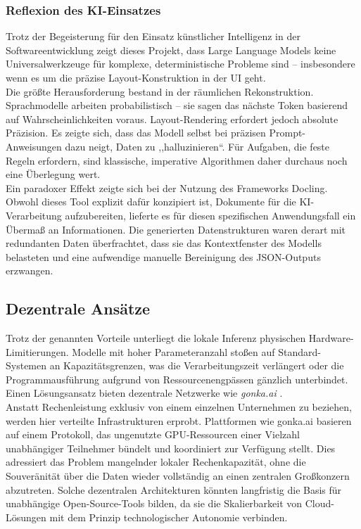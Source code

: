 \documentclass[a4paper]{article}
\begin{document}
\subsubsection{Reflexion des KI-Einsatzes}
Trotz der Begeisterung für den Einsatz künstlicher Intelligenz in der Softwareentwicklung zeigt dieses Projekt, dass Large Language Models keine Universalwerkzeuge für komplexe, deterministische Probleme sind – insbesondere wenn es um die präzise Layout-Konstruktion in der UI geht.\\


Die größte Herausforderung bestand in der räumlichen Rekonstruktion. Sprachmodelle arbeiten probabilistisch – sie sagen das nächste Token basierend auf Wahrscheinlichkeiten voraus. Layout-Rendering erfordert jedoch absolute Präzision.
Es zeigte sich, dass das Modell selbst bei präzisen Prompt-Anweisungen dazu neigt, Daten zu ,,halluzinieren``. Für Aufgaben, die feste Regeln erfordern, sind klassische, imperative Algorithmen daher durchaus noch eine Überlegung wert.\\


Ein paradoxer Effekt zeigte sich bei der Nutzung des Frameworks {Docling}. Obwohl dieses Tool explizit dafür konzipiert ist, Dokumente für die KI-Verarbeitung aufzubereiten, lieferte es für diesen spezifischen Anwendungsfall ein Übermaß an Informationen. Die generierten Datenstrukturen waren derart mit redundanten Daten überfrachtet, dass sie das Kontextfenster des Modells belasteten und eine aufwendige manuelle Bereinigung des JSON-Outputs erzwangen.


\subsection{Dezentrale Ansätze}

Trotz der genannten Vorteile unterliegt die lokale Inferenz physischen Hardware-Limitierungen. Modelle mit hoher Parameteranzahl stoßen auf Standard-Systemen an Kapazitätsgrenzen, was die Verarbeitungszeit verlängert oder die Programmausführung aufgrund von Ressourcenengpässen gänzlich unterbindet. Einen Lösungsansatz bieten dezentrale Netzwerke wie \textit{gonka.ai} \citep{GonkaAI}.\\

Anstatt Rechenleistung exklusiv von einem einzelnen Unternehmen zu beziehen, werden hier verteilte Infrastrukturen erprobt. Plattformen wie gonka.ai basieren auf einem Protokoll, das ungenutzte GPU-Ressourcen einer Vielzahl unabhängiger Teilnehmer bündelt und koordiniert zur Verfügung stellt. Dies adressiert das Problem mangelnder lokaler Rechenkapazität, ohne die Souveränität über die Daten wieder vollständig an einen zentralen Großkonzern abzutreten. Solche dezentralen Architekturen könnten langfristig die Basis für unabhängige Open-Source-Tools bilden, da sie die Skalierbarkeit von Cloud-Lösungen mit dem Prinzip technologischer Autonomie verbinden.
\end{document}
